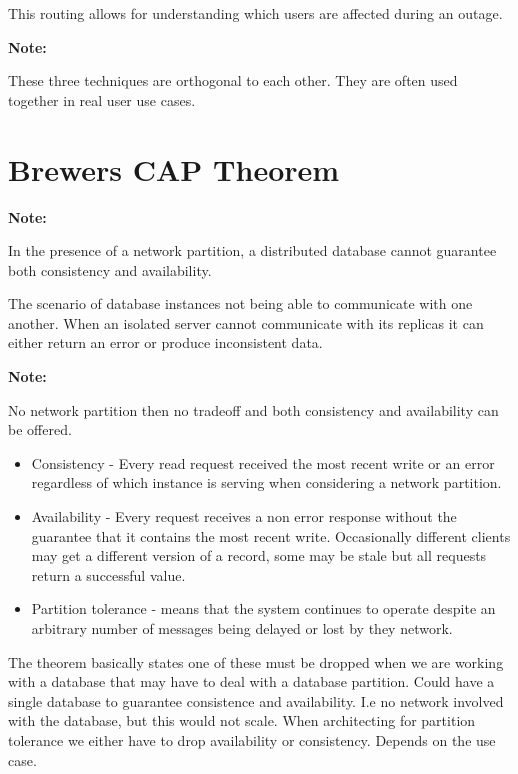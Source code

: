 \documentclass[a4paper, 11pt]{book}
\newenvironment{note}{
    \begin{siderule}
        \textbf{Note: }
        }{
    \end{siderule}}
\begin{document}
    This routing allows for understanding which users are affected during an outage.

    \begin{note}
        These three techniques are orthogonal to each other.
        They are often used together in real user use cases.
    \end{note}


    \section{Brewers CAP Theorem}

    \begin{note}
    In the presence of a network partition, a distributed database cannot guarantee both consistency and availability.
    \end{note}

    The scenario of database instances not being able to communicate with one another.
    When an isolated server cannot communicate with its replicas it can either return an error or produce inconsistent data.

    \begin{note}
No network partition then no tradeoff and both consistency and availability can be offered.
    \end{note}

    \begin{itemize}
        \item Consistency - Every read request received the most recent write or an error regardless of which instance is serving when considering a network partition.
        \item Availability - Every request receives a non error response without the guarantee that it contains the most recent write.
        Occasionally different clients may get a different version of a record, some may be stale but all requests return a successful value.
        \item Partition tolerance - means that the system continues to operate despite an arbitrary number of messages being delayed or lost by they network.
    \end{itemize}

    The theorem basically states one of these must be dropped when we are working with a database that may have to deal with a database partition.
    Could have a single database to guarantee consistence and availability. I.e no network involved with the database, but this would not scale.
    When architecting for partition tolerance we either have to drop availability or consistency.
    Depends on the use case.
\end{document}
